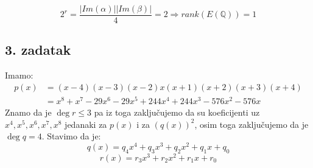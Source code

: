 \documentclass[12pt, a4paper]{article}
\begin{document}
\begin{spacing}{1.5}
\[2^r=\frac{|Im(\alpha)||Im(\beta)|}{4}=2 \Rightarrow rank(E(\mathbb{Q}))=1\]
\newpage
\subsection{3. zadatak}
Imamo:
\begin{align}
p(x) &= (x - 4)(x - 3)(x - 2)x(x + 1)(x + 2)(x + 3)(x + 4) \\
\label{eq:polRas}   
     &= x^8+x^7-29x^6 -29 x^5+244 x^4 + 244 x^3 -576 x^2 - 576 x
\end{align}
Znamo da je $\deg r \leq 3$ pa iz toga zaključujemo da su koeficijenti uz $x^4,x^5, x^6, x^7, x^8$ jedanaki za $p(x)$ i za $(q(x))^2$, osim toga zaključujemo da je $\deg q = 4$. Stavimo da je:
\begin{equation}
	\label{eq:polinomQ}
	q(x)=q_4 x^4 + q_3 x^3 + q_2 x^2+ q_1 x+ q_0
\end{equation}
\begin{equation}
\label{eq:polinomR}
	r(x)=r_3 x^3 + r_2 x^2 + r_1 x+r_0	
\end{equation}


\end{spacing}
\end{document}
